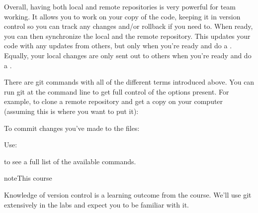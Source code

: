 \documentclass[letterpaper,10pt,british]{sphinxmanual}
\begin{document}
\sphinxAtStartPar
Overall, having both local and remote repositories is very powerful for team working. It allows you to work on your copy of the code, keeping it in version control so you can track any changes and/or roll\sphinxhyphen{}back if you need to. When ready, you can then synchronize the local and the remote repository. This updates your code with any updates from others, but only when you’re ready and do a . Equally, your local changes are only sent out to others when you’re ready and do a .

\sphinxAtStartPar
There are git commands with all of the different terms introduced above. You can run git at the command line to get full control of the options present. For example, to clone a remote repository and get a copy on your computer (assuming this is where you want to put it):

\begin{sphinxVerbatim}[commandchars=\\\{\}]
\end{sphinxVerbatim}

\sphinxAtStartPar
To commit changes you’ve made to the files:

\begin{sphinxVerbatim}[commandchars=\\\{\}]
\end{sphinxVerbatim}

\sphinxAtStartPar
Use:

\begin{sphinxVerbatim}[commandchars=\\\{\}]
\end{sphinxVerbatim}

\sphinxAtStartPar
to see a full list of the available commands.

\begin{sphinxadmonition}{note}{This course}

\sphinxAtStartPar
Knowledge of version control is a learning outcome from the course. We’ll use git extensively in the labs and expect you to be familiar with it.
\end{sphinxadmonition}
\end{document}
